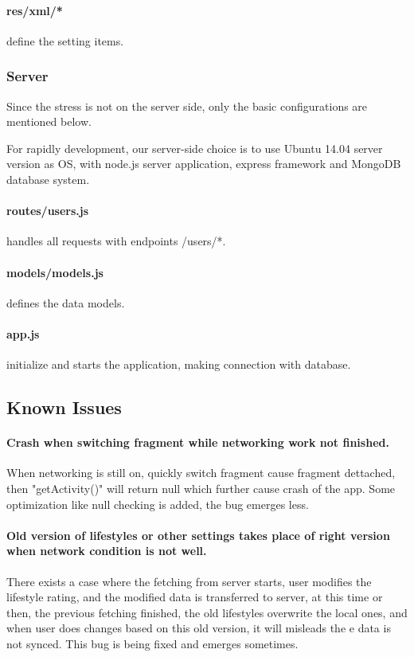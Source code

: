\documentclass[10pt,a4paper,final]{scrartcl}
\begin{document}
\paragraph{res/xml/*} define the setting items.





\subsubsection{Server}

Since the stress is not on the server side, only the basic configurations are mentioned below.

For rapidly development, our server-side choice is to use Ubuntu 14.04 server version as OS, with node.js server application, express framework and MongoDB database system. 

\paragraph{routes/users.js} handles all requests with endpoints /users/*.
\paragraph{models/models.js} defines the data models.
\paragraph{app.js} initialize and starts the application, making connection with database.

\subsection{Known Issues}

\paragraph{Crash when switching fragment while networking work not finished.} 
When networking is still on, quickly switch fragment cause fragment dettached, then "getActivity()" will return null which further cause crash of the app. Some optimization like null checking is added, the bug emerges less. 
\paragraph{Old version of lifestyles or other settings takes place of right version when network condition is not well.}
There exists a case where the fetching from server starts, user modifies the lifestyle rating, and the modified data is transferred to server, at this time or then, the previous fetching finished, the old lifestyles overwrite the local ones, and when user does changes based on this old version, it will misleads the e data is not synced. This bug is being fixed and emerges sometimes. 
\end{document}
